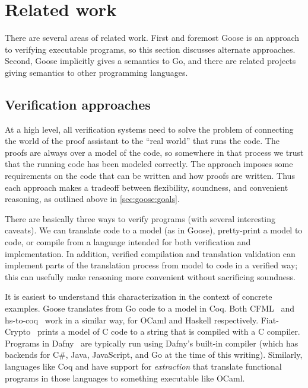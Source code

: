 \section{Related work}%
\label{s:goose:rel-work}

There are several areas of related work. First and foremost Goose is an approach
to verifying executable programs, so this section discusses alternate
approaches. Second, Goose implicitly gives a semantics to Go, and there are
related projects giving semantics to other programming languages.

\subsection{Verification approaches}

At a high level, all verification systems need to solve the problem of
connecting the world of the proof assistant to the ``real world'' that runs the
code. The proofs are always over a model of the code, so somewhere in that
process we trust that the running code has been modeled correctly. The approach
imposes some requirements on the code that can be written and how proofs are
written. Thus each approach makes a tradeoff between flexibility, soundness, and
convenient reasoning, as outlined above in \cref{sec:goose:goals}.

There are basically three ways to verify programs (with several interesting
caveats). We can translate code to a model (as in Goose), pretty-print a
model to code, or compile from a language intended for both verification and
implementation. In addition, verified compilation and translation validation can
implement parts of the translation process from model to code in a verified way;
this can usefully make reasoning more convenient without sacrificing soundness.

It is easiest to understand this characterization in the context of concrete
examples. Goose translates from Go code to a model in Coq. Both
CFML~\cite{chargueraud:cfml} and hs-to-coq~\cite{spector-zabusky:hstocoq} work
in a similar way, for OCaml and Haskell respectively.
Fiat-Crypto~\cite{erbsen:fiat-crypto} prints a model of C code to a string that
is compiled with a C compiler. Programs in Dafny~\cite{leino:dafny} are
typically run using Dafny's built-in compiler (which has backends for C\#, Java,
JavaScript, and Go at the time of this writing). Similarly, languages like Coq
and \fstar have support for \emph{extraction} that translate functional programs
in those languages to something executable like OCaml.

